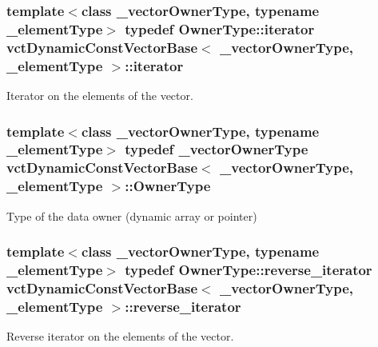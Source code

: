 \subsubsection[{iterator}]{\setlength{\rightskip}{0pt plus 5cm}template$<$class \+\_\+vector\+Owner\+Type, typename \+\_\+element\+Type$>$ typedef Owner\+Type\+::iterator {\bf vct\+Dynamic\+Const\+Vector\+Base}$<$ \+\_\+vector\+Owner\+Type, \+\_\+element\+Type $>$\+::{\bf iterator}}\label{classvct_dynamic_const_vector_base_aaed13bc31a9ee4971bad765ba5c2c811}
Iterator on the elements of the vector. \hypertarget{classvct_dynamic_const_vector_base_a6d92548fcc7076cbd4c091ceb0faf364}{}
\subsubsection[{Owner\+Type}]{\setlength{\rightskip}{0pt plus 5cm}template$<$class \+\_\+vector\+Owner\+Type, typename \+\_\+element\+Type$>$ typedef \+\_\+vector\+Owner\+Type {\bf vct\+Dynamic\+Const\+Vector\+Base}$<$ \+\_\+vector\+Owner\+Type, \+\_\+element\+Type $>$\+::{\bf Owner\+Type}}\label{classvct_dynamic_const_vector_base_a6d92548fcc7076cbd4c091ceb0faf364}
Type of the data owner (dynamic array or pointer) \hypertarget{classvct_dynamic_const_vector_base_af10d167259519ceeca9276da3435e193}{}
\subsubsection[{reverse\+\_\+iterator}]{\setlength{\rightskip}{0pt plus 5cm}template$<$class \+\_\+vector\+Owner\+Type, typename \+\_\+element\+Type$>$ typedef Owner\+Type\+::reverse\+\_\+iterator {\bf vct\+Dynamic\+Const\+Vector\+Base}$<$ \+\_\+vector\+Owner\+Type, \+\_\+element\+Type $>$\+::{\bf reverse\+\_\+iterator}}\label{classvct_dynamic_const_vector_base_af10d167259519ceeca9276da3435e193}
Reverse iterator on the elements of the vector. \hypertarget{classvct_dynamic_const_vector_base_a39da273523717f678f54d3321ebca3dd}{}
